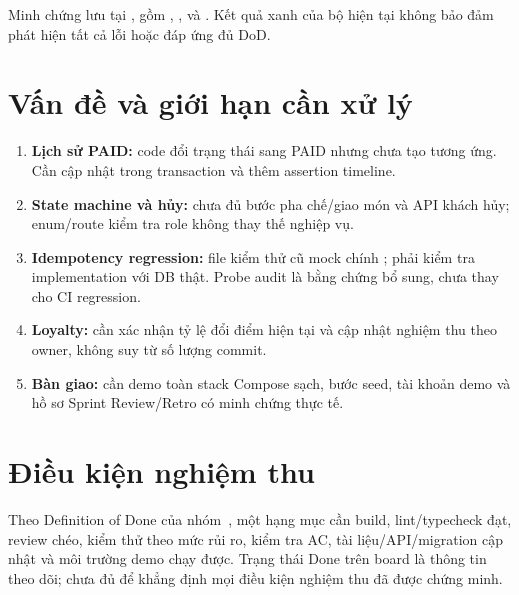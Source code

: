 Minh chứng lưu tại
, gồm
, ,
 và . Kết quả xanh của bộ
hiện tại không bảo đảm phát hiện tất cả lỗi hoặc đáp ứng đủ DoD.

\section{Vấn đề và giới hạn cần xử lý}
\begin{enumerate}
    \item \textbf{Lịch sử PAID:} code đổi trạng thái sang PAID nhưng
     chưa tạo  tương ứng.
    Cần cập nhật trong transaction và thêm assertion timeline.
    \item \textbf{State machine và hủy:} chưa đủ bước pha chế/giao món
    và API khách hủy; enum/route kiểm tra role không thay thế nghiệp vụ.
    \item \textbf{Idempotency regression:} file kiểm thử cũ mock chính
    ; phải kiểm tra implementation với DB thật.
    Probe audit là bằng chứng bổ sung, chưa thay cho CI regression.
    \item \textbf{Loyalty:} cần xác nhận tỷ lệ đổi điểm hiện tại và cập
    nhật nghiệm thu theo owner, không suy từ số lượng commit.
    \item \textbf{Bàn giao:} cần demo toàn stack Compose sạch, bước seed,
    tài khoản demo và hồ sơ Sprint Review/Retro có minh chứng thực tế.
\end{enumerate}

\section{Điều kiện nghiệm thu}
Theo Definition of Done của nhóm~\cite{dod}, một hạng mục cần build,
lint/typecheck đạt, review chéo, kiểm thử theo mức rủi ro, kiểm tra AC,
tài liệu/API/migration cập nhật và môi trường demo chạy được. Trạng thái
Done trên board là thông tin theo dõi; chưa đủ để khẳng định mọi điều
kiện nghiệm thu đã được chứng minh.
